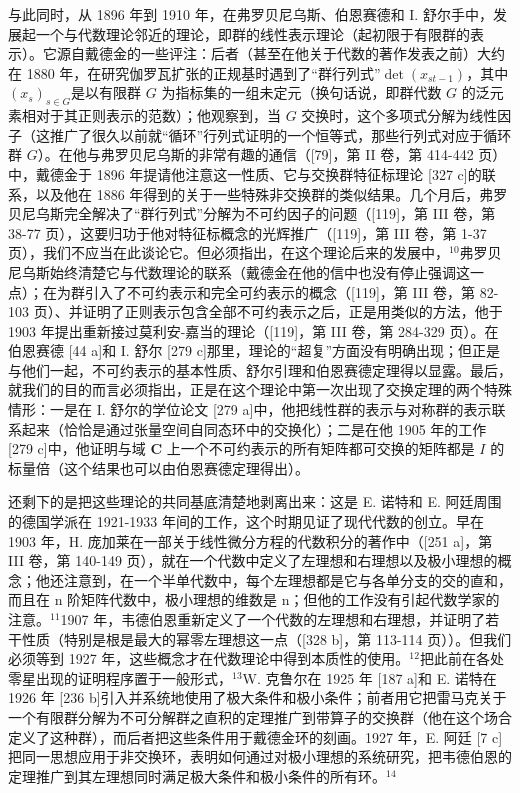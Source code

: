 与此同时，从 1896 年到 1910 年，在弗罗贝尼乌斯、伯恩赛德和 I. 舒尔手中，发展起一个与代数理论邻近的理论，即群的线性表示理论（起初限于有限群的表示）。它源自戴德金的一些评注：后者（甚至在他关于代数的著作发表之前）大约在 1880 年，在研究伽罗瓦扩张的正规基时遇到了“群行列式”\(\det(x_{st-1})\)，其中 \((x_s)_{s \in G}\)是以有限群 \(G\) 为指标集的一组未定元（换句话说，即群代数 \(G\) 的泛元素相对于其正则表示的范数）；他观察到，当 \(G\) 交换时，这个多项式分解为线性因子（这推广了很久以前就“循环”行列式证明的一个恒等式，那些行列式对应于循环群 \(G\)）。在他与弗罗贝尼乌斯的非常有趣的通信（{[}79{]}，第 II 卷，第 414-442 页）中，戴德金于 1896 年提请他注意这一性质、它与交换群特征标理论 {[}327 c{]}的联系，以及他在 1886 年得到的关于一些特殊非交换群的类似结果。几个月后，弗罗贝尼乌斯完全解决了“群行列式”分解为不可约因子的问题（{[}119{]}，第 III 卷，第 38-77 页），这要归功于他对特征标概念的光辉推广（{[}119{]}，第 III 卷，第 1-37 页），我们不应当在此谈论它。但必须指出，在这个理论后来的发展中，\(^{10}\)弗罗贝尼乌斯始终清楚它与代数理论的联系（戴德金在他的信中也没有停止强调这一点）；在为群引入了不可约表示和完全可约表示的概念（{[}119{]}，第 III 卷，第 82-103 页）、并证明了正则表示包含全部不可约表示之后，正是用类似的方法，他于 1903 年提出重新接过莫利安-嘉当的理论（{[}119{]}，第 III 卷，第 284-329 页）。在伯恩赛德 {[}44 a{]}和 I. 舒尔 {[}279 c{]}那里，理论的“超复”方面没有明确出现；但正是与他们一起，不可约表示的基本性质、舒尔引理和伯恩赛德定理得以显露。最后，就我们的目的而言必须指出，正是在这个理论中第一次出现了交换定理的两个特殊情形：一是在 I. 舒尔的学位论文 {[}279 a{]}中，他把线性群的表示与对称群的表示联系起来（恰恰是通过张量空间自同态环中的交换化）；二是在他 1905 年的工作 {[}279 c{]}中，他证明与域 \(\mathbf{C}\) 上一个不可约表示的所有矩阵都可交换的矩阵都是 \(I\) 的标量倍（这个结果也可以由伯恩赛德定理得出）。

还剩下的是把这些理论的共同基底清楚地剥离出来：这是 E. 诺特和 E. 阿廷周围的德国学派在 1921-1933 年间的工作，这个时期见证了现代代数的创立。早在 1903 年，H. 庞加莱在一部关于线性微分方程的代数积分的著作中（{[}251 a{]}，第 III 卷，第 140-149 页），就在一个代数中定义了左理想和右理想以及极小理想的概念；他还注意到，在一个半单代数中，每个左理想都是它与各单分支的交的直和，而且在 n 阶矩阵代数中，极小理想的维数是 n；但他的工作没有引起代数学家的注意。\(^{11}\)1907 年，韦德伯恩重新定义了一个代数的左理想和右理想，并证明了若干性质（特别是根是最大的幂零左理想这一点（{[}328 b{]}，第 113-114 页））。但我们必须等到 1927 年，这些概念才在代数理论中得到本质性的使用。\(^{12}\)把此前在各处零星出现的证明程序置于一般形式，\(^{13}\)W. 克鲁尔在 1925 年 {[}187 a{]}和 E. 诺特在 1926 年 {[}236 b{]}引入并系统地使用了极大条件和极小条件；前者用它把雷马克关于一个有限群分解为不可分解群之直积的定理推广到带算子的交换群（他在这个场合定义了这种群），而后者把这些条件用于戴德金环的刻画。1927 年，E. 阿廷 {[}7 c{]}把同一思想应用于非交换环，表明如何通过对极小理想的系统研究，把韦德伯恩的定理推广到其左理想同时满足极大条件和极小条件的所有环。\(^{14}\)


